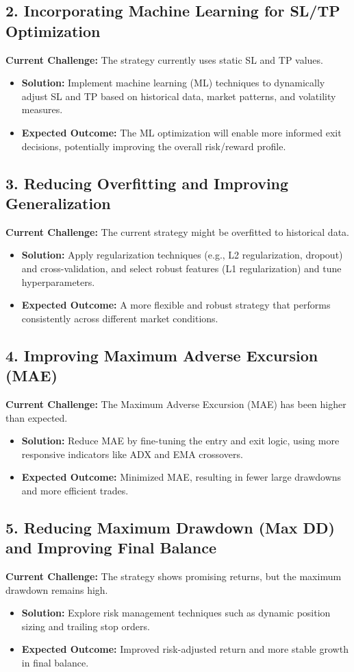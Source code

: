 \documentclass[12pt]{article}
\begin{document}
\subsection*{2. Incorporating Machine Learning for SL/TP Optimization}
\textbf{Current Challenge:} The strategy currently uses static SL and TP values.
\begin{itemize}
    \item \textbf{Solution:} Implement machine learning (ML) techniques to dynamically adjust SL and TP based on historical data, market patterns, and volatility measures.
    \item \textbf{Expected Outcome:} The ML optimization will enable more informed exit decisions, potentially improving the overall risk/reward profile.
\end{itemize}

\subsection*{3. Reducing Overfitting and Improving Generalization}
\textbf{Current Challenge:} The current strategy might be overfitted to historical data.
\begin{itemize}
    \item \textbf{Solution:} Apply regularization techniques (e.g., L2 regularization, dropout) and cross-validation, and select robust features (L1 regularization) and tune hyperparameters.
    \item \textbf{Expected Outcome:} A more flexible and robust strategy that performs consistently across different market conditions.
\end{itemize}

\subsection*{4. Improving Maximum Adverse Excursion (MAE)}
\textbf{Current Challenge:} The Maximum Adverse Excursion (MAE) has been higher than expected.
\begin{itemize}
    \item \textbf{Solution:} Reduce MAE by fine-tuning the entry and exit logic, using more responsive indicators like ADX and EMA crossovers.
    \item \textbf{Expected Outcome:} Minimized MAE, resulting in fewer large drawdowns and more efficient trades.
\end{itemize}

\subsection*{5. Reducing Maximum Drawdown (Max DD) and Improving Final Balance}
\textbf{Current Challenge:} The strategy shows promising returns, but the maximum drawdown remains high.
\begin{itemize}
    \item \textbf{Solution:} Explore risk management techniques such as dynamic position sizing and trailing stop orders.
    \item \textbf{Expected Outcome:} Improved risk-adjusted return and more stable growth in final balance.
\end{itemize}
\end{document}
